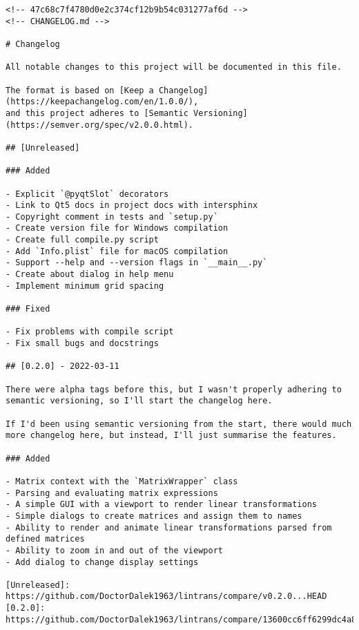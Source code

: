 \documentclass[../development.tex]{subfiles}
\begin{document}
{
\renewcommand\theFancyVerbLine{ \ttfamily
	\textcolor[rgb]{0.5,0.5,1}{
		\footnotesize
		\oldstylenums{
			\ifnum\value{FancyVerbLine}=-3 \else
			\ifnum\value{FancyVerbLine}=-2 \else
			\ifnum\value{FancyVerbLine}=-1\setcounter{FancyVerbLine}{0}\else
				\arabic{FancyVerbLine}
			\fi\fi\fi
		}
	}
}
\begin{verbatim}
<!-- 47c68c7f4780d0e2c374cf12b9b54c031277af6d -->
<!-- CHANGELOG.md -->

# Changelog

All notable changes to this project will be documented in this file.

The format is based on [Keep a Changelog](https://keepachangelog.com/en/1.0.0/),
and this project adheres to [Semantic Versioning](https://semver.org/spec/v2.0.0.html).

## [Unreleased]

### Added

- Explicit `@pyqtSlot` decorators
- Link to Qt5 docs in project docs with intersphinx
- Copyright comment in tests and `setup.py`
- Create version file for Windows compilation
- Create full compile.py script
- Add `Info.plist` file for macOS compilation
- Support --help and --version flags in `__main__.py`
- Create about dialog in help menu
- Implement minimum grid spacing

### Fixed

- Fix problems with compile script
- Fix small bugs and docstrings

## [0.2.0] - 2022-03-11

There were alpha tags before this, but I wasn't properly adhering to semantic versioning, so I'll start the changelog here.

If I'd been using semantic versioning from the start, there would much more changelog here, but instead, I'll just summarise the features.

### Added

- Matrix context with the `MatrixWrapper` class
- Parsing and evaluating matrix expressions
- A simple GUI with a viewport to render linear transformations
- Simple dialogs to create matrices and assign them to names
- Ability to render and animate linear transformations parsed from defined matrices
- Ability to zoom in and out of the viewport
- Add dialog to change display settings

[Unreleased]: https://github.com/DoctorDalek1963/lintrans/compare/v0.2.0...HEAD
[0.2.0]: https://github.com/DoctorDalek1963/lintrans/compare/13600cc6ff6299dc4a8101a367bc52fe08607554...v0.2.0
\end{verbatim}
}
\end{document}
